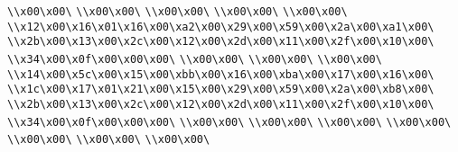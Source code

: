 \verb|\\x00\x00\|\newline
\verb|\\x00\x00\|\newline
\verb|\\x00\x00\|\newline
\verb|\\x00\x00\|\newline
\verb|\\x00\x00\|\newline
\verb|\\x12\x00\x16\x01\x16\x00\xa2\x00\x29\x00\x59\x00\x2a\x00\xa1\x00\|\newline
\verb|\\x2b\x00\x13\x00\x2c\x00\x12\x00\x2d\x00\x11\x00\x2f\x00\x10\x00\|\newline
\verb|\\x34\x00\x0f\x00\x00\x00\|\newline
\verb|\\x00\x00\|\newline
\verb|\\x00\x00\|\newline
\verb|\\x00\x00\|\newline
\verb|\\x14\x00\x5c\x00\x15\x00\xbb\x00\x16\x00\xba\x00\x17\x00\x16\x00\|\newline
\verb|\\x1c\x00\x17\x01\x21\x00\x15\x00\x29\x00\x59\x00\x2a\x00\xb8\x00\|\newline
\verb|\\x2b\x00\x13\x00\x2c\x00\x12\x00\x2d\x00\x11\x00\x2f\x00\x10\x00\|\newline
\verb|\\x34\x00\x0f\x00\x00\x00\|\newline
\verb|\\x00\x00\|\newline
\verb|\\x00\x00\|\newline
\verb|\\x00\x00\|\newline
\verb|\\x00\x00\|\newline
\verb|\\x00\x00\|\newline
\verb|\\x00\x00\|\newline
\verb|\\x00\x00\|\newline

